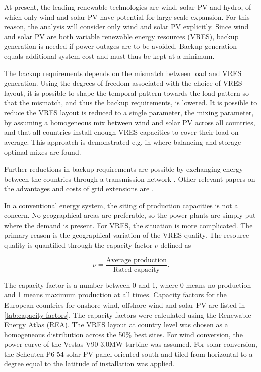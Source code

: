 \documentclass[a4paper, 5p, sort&compress]{elsarticle}%
\begin{document}
At present, the leading renewable technologies are wind, solar PV and
hydro, of which only wind and solar PV have potential for large-scale
expansion. For this reason, the analysis will consider only wind and
solar PV explicitly. Since wind and solar PV are both variable
renewable energy resources (VRES), backup generation is needed if
power outages are to be avoided. Backup generation equals additional
system cost and must thus be kept at a minimum.

The backup requirements depends on the mismatch between load and VRES
generation. Using the degrees of freedom associated with the choice of
VRES layout, it is possible to shape the temporal pattern towards the
load pattern so that the mismatch, and thus the backup requirements,
is lowered. It is possible to reduce the VRES layout is reduced to a
single parameter, the mixing parameter, by assuming a homogeneous mix
between wind and solar PV across all countries, and that all countries
install enough VRES capacities to cover their load on average. This
approatch is demonstrated e.g. in \cite{Heide2010,Heide2011} where
balancing and storage optimal mixes are found.

Further reductions in backup requirements are possible by exchanging
energy between the countries through a transmission network
\cite{rolando2014,sarah}. Other relevant papers on the advantages and
costs of grid extensions are \cite{Schaber, Schaber2}.


In a conventional energy system, the siting of production capacities
is not a concern. No geographical areas are preferable, so the power
plants are simply put where the demand is present. For VRES, the
situation is more complicated. The primary reason is the geographical
variation of the VRES
quality. %
The resource quality is quantified through the capacity factor $\nu$ defined as

\begin{equation}
  \label{eq:1}
  \nu = \frac{\mbox{Average production}}{\mbox{Rated capacity}} .
\end{equation}

The capacity factor is a number between 0 and 1, where 0 means no
production and 1 means maximum production at all times. Capacity
factors for the European countries for onshore wind, offshore wind and
solar PV are listed in \cref{tab:capacity-factors}. The capacity
factors were calculated using the Renewable Energy Atlas\cite{REA}
(REA). The VRES layout at country level was chosen as a homogeneous
distribution across the 50\% best sites. For wind conversion, the
power curve of the Vestas V90 3.0MW turbine was assumed. For solar
conversion, the Scheuten P6-54 solar PV panel oriented south and tiled
from horizontal to a degree equal to the latitude of installation was
applied.
\end{document}

